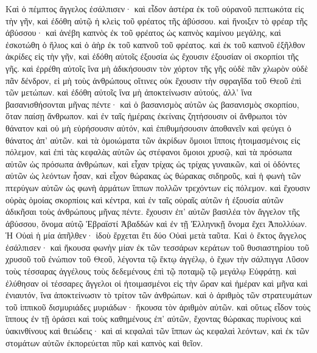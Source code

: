 \begin{pages}
    \begin{Rightside}
        \beginnumbering
		Καὶ ὁ πέμπτος ἄγγελος ἐσάλπισεν· καὶ εἶδον ἀστέρα ἐκ τοῦ οὐρανοῦ πεπτωκότα εἰς τὴν γῆν, καὶ ἐδόθη αὐτῷ ἡ κλεὶς τοῦ φρέατος τῆς ἀβύσσου. καὶ ἤνοιξεν τὸ φρέαρ τῆς ἀβύσσου· καὶ ἀνέβη καπνὸς ἐκ τοῦ φρέατος ὡς καπνὸς καμίνου μεγάλης, καὶ ἐσκοτώθη ὁ ἥλιος καὶ ὁ ἀὴρ ἐκ τοῦ καπνοῦ τοῦ φρέατος. 
		\pend
		\pstart
		καὶ ἐκ τοῦ καπνοῦ ἐξῆλθον ἀκρίδες εἰς τὴν γῆν, καὶ ἐδόθη αὐτοῖς ἐξουσία ὡς ἔχουσιν ἐξουσίαν οἱ σκορπίοι τῆς γῆς. καὶ ἐρρέθη αὐτοῖς ἵνα μὴ ἀδικήσουσιν τὸν χόρτον τῆς γῆς οὐδὲ πᾶν χλωρὸν οὐδὲ πᾶν δένδρον, εἰ μὴ τοὺς ἀνθρώπους οἵτινες οὐκ ἔχουσιν τὴν σφραγῖδα τοῦ Θεοῦ ἐπὶ τῶν μετώπων. 
		\pend
		\pstart
		καὶ ἐδόθη αὐτοῖς ἵνα μὴ ἀποκτείνωσιν αὐτούς, ἀλλ’ ἵνα βασανισθήσονται μῆνας πέντε· καὶ ὁ βασανισμὸς αὐτῶν ὡς βασανισμὸς σκορπίου, ὅταν παίσῃ ἄνθρωπον. καὶ ἐν ταῖς ἡμέραις ἐκείναις ζητήσουσιν οἱ ἄνθρωποι τὸν θάνατον καὶ οὐ μὴ εὑρήσουσιν αὐτόν, καὶ ἐπιθυμήσουσιν ἀποθανεῖν καὶ φεύγει ὁ θάνατος ἀπ’ αὐτῶν. 
		\pend
		\pstart
		καὶ τὰ ὁμοιώματα τῶν ἀκρίδων ὅμοιοι ἵπποις ἡτοιμασμένοις εἰς πόλεμον, καὶ ἐπὶ τὰς κεφαλὰς αὐτῶν ὡς στέφανοι ὅμοιοι χρυσῷ, καὶ τὰ πρόσωπα αὐτῶν ὡς πρόσωπα ἀνθρώπων, καὶ εἶχαν τρίχας ὡς τρίχας γυναικῶν, καὶ οἱ ὀδόντες αὐτῶν ὡς λεόντων ἦσαν, καὶ εἶχον θώρακας ὡς θώρακας σιδηροῦς, καὶ ἡ φωνὴ τῶν πτερύγων αὐτῶν ὡς φωνὴ ἁρμάτων ἵππων πολλῶν τρεχόντων εἰς πόλεμον. 
		\pend
		\pstart
		καὶ ἔχουσιν οὐρὰς ὁμοίας σκορπίοις καὶ κέντρα, καὶ ἐν ταῖς οὐραῖς αὐτῶν ἡ ἐξουσία αὐτῶν ἀδικῆσαι τοὺς ἀνθρώπους μῆνας πέντε. ἔχουσιν ἐπ’ αὐτῶν βασιλέα τὸν ἄγγελον τῆς ἀβύσσου, ὄνομα αὐτῷ Ἑβραϊστί Ἀβαδδών καὶ ἐν τῇ Ἑλληνικῇ ὄνομα ἔχει Ἀπολλύων. Ἡ Οὐαὶ ἡ μία ἀπῆλθεν· ἰδοὺ ἔρχεται ἔτι δύο Οὐαὶ μετὰ ταῦτα.
		\pend
		\pstart
		Καὶ ὁ ἕκτος ἄγγελος ἐσάλπισεν· καὶ ἤκουσα φωνὴν μίαν ἐκ τῶν τεσσάρων κεράτων τοῦ θυσιαστηρίου τοῦ χρυσοῦ τοῦ ἐνώπιον τοῦ Θεοῦ, λέγοντα τῷ ἕκτῳ ἀγγέλῳ, ὁ ἔχων τὴν σάλπιγγα Λῦσον τοὺς τέσσαρας ἀγγέλους τοὺς δεδεμένους ἐπὶ τῷ ποταμῷ τῷ μεγάλῳ Εὐφράτῃ. καὶ ἐλύθησαν οἱ τέσσαρες ἄγγελοι οἱ ἡτοιμασμένοι εἰς τὴν ὥραν καὶ ἡμέραν καὶ μῆνα καὶ ἐνιαυτόν, ἵνα ἀποκτείνωσιν τὸ τρίτον τῶν ἀνθρώπων. καὶ ὁ ἀριθμὸς τῶν στρατευμάτων τοῦ ἱππικοῦ δισμυριάδες μυριάδων· ἤκουσα τὸν ἀριθμὸν αὐτῶν. 
		\pend
		\pstart
		καὶ οὕτως εἶδον τοὺς ἵππους ἐν τῇ ὁράσει καὶ τοὺς καθημένους ἐπ’ αὐτῶν, ἔχοντας θώρακας πυρίνους καὶ ὑακινθίνους καὶ θειώδεις· καὶ αἱ κεφαλαὶ τῶν ἵππων ὡς κεφαλαὶ λεόντων, καὶ ἐκ τῶν στομάτων αὐτῶν ἐκπορεύεται πῦρ καὶ καπνὸς καὶ θεῖον. 

\end{Rightside}
\end{pages}
